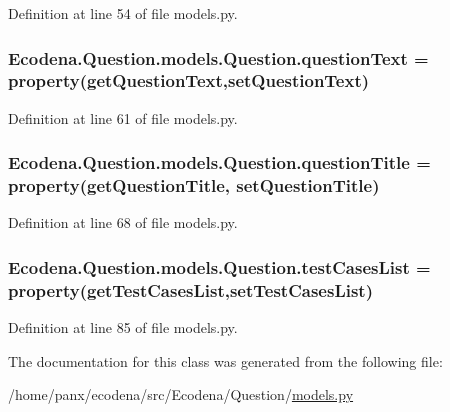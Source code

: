 Definition at line 54 of file models.py.

\hypertarget{class_ecodena_1_1_question_1_1models_1_1_question_a631229209b3603bc293f5c6b751781cc}{
\subsubsection[{questionText}]{\setlength{\rightskip}{0pt plus 5cm}Ecodena.Question.models.Question.questionText = property(getQuestionText,setQuestionText)}}
\label{d1/d67/class_ecodena_1_1_question_1_1models_1_1_question_a631229209b3603bc293f5c6b751781cc}


Definition at line 61 of file models.py.

\hypertarget{class_ecodena_1_1_question_1_1models_1_1_question_aa28e2b08e1d5c9a31737359492c2e1b1}{
\subsubsection[{questionTitle}]{\setlength{\rightskip}{0pt plus 5cm}Ecodena.Question.models.Question.questionTitle = property(getQuestionTitle, setQuestionTitle)}}
\label{d1/d67/class_ecodena_1_1_question_1_1models_1_1_question_aa28e2b08e1d5c9a31737359492c2e1b1}


Definition at line 68 of file models.py.

\hypertarget{class_ecodena_1_1_question_1_1models_1_1_question_aac636325b58fc117b2c89f6ece79f431}{
\subsubsection[{testCasesList}]{\setlength{\rightskip}{0pt plus 5cm}Ecodena.Question.models.Question.testCasesList = property(getTestCasesList,setTestCasesList)}}
\label{d1/d67/class_ecodena_1_1_question_1_1models_1_1_question_aac636325b58fc117b2c89f6ece79f431}


Definition at line 85 of file models.py.



The documentation for this class was generated from the following file:\begin{DoxyCompactItemize}
\item 
/home/panx/ecodena/src/Ecodena/Question/\hyperlink{_question_2models_8py}{models.py}\end{DoxyCompactItemize}
